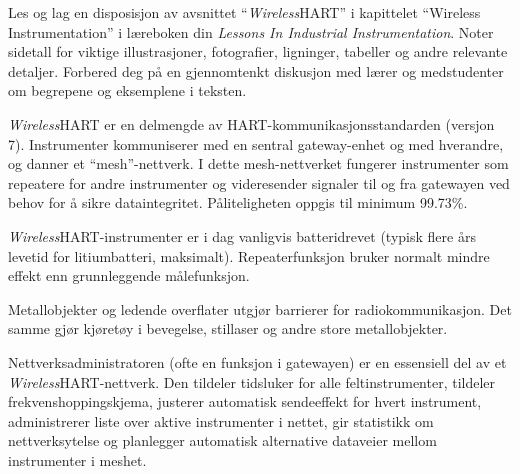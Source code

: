 

Les og lag en disposisjon av avsnittet ``{\sl Wireless}HART'' i kapittelet ``Wireless Instrumentation'' i læreboken din \textit{Lessons In Industrial Instrumentation}. Noter sidetall for viktige illustrasjoner, fotografier, ligninger, tabeller og andre relevante detaljer. Forbered deg på en gjennomtenkt diskusjon med lærer og medstudenter om begrepene og eksemplene i teksten.














{\sl Wireless}HART er en delmengde av HART-kommunikasjonsstandarden (versjon 7). Instrumenter kommuniserer med en sentral gateway-enhet og med hverandre, og danner et ``mesh''-nettverk. I dette mesh-nettverket fungerer instrumenter som repeatere for andre instrumenter og videresender signaler til og fra gatewayen ved behov for å sikre dataintegritet. Påliteligheten oppgis til minimum 99.73\%.

\vskip 10pt

{\sl Wireless}HART-instrumenter er i dag vanligvis batteridrevet (typisk flere års levetid for litiumbatteri, maksimalt). Repeaterfunksjon bruker normalt mindre effekt enn grunnleggende målefunksjon.

\vskip 10pt

Metallobjekter og ledende overflater utgjør barrierer for radiokommunikasjon. Det samme gjør kjøretøy i bevegelse, stillaser og andre store metallobjekter.

\vskip 10pt

Nettverksadministratoren (ofte en funksjon i gatewayen) er en essensiell del av et {\sl Wireless}HART-nettverk. Den tildeler tidsluker for alle feltinstrumenter, tildeler frekvenshoppingskjema, justerer automatisk sendeeffekt for hvert instrument, administrerer liste over aktive instrumenter i nettet, gir statistikk om nettverksytelse og planlegger automatisk alternative dataveier mellom instrumenter i meshet.

\vskip 30pt

